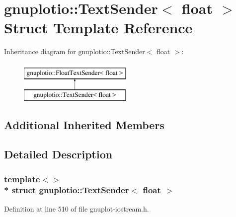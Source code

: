 \hypertarget{structgnuplotio_1_1_text_sender_3_01float_01_4}{}\section{gnuplotio\+:\+:Text\+Sender$<$ float $>$ Struct Template Reference}
\label{structgnuplotio_1_1_text_sender_3_01float_01_4}
Inheritance diagram for gnuplotio\+:\+:Text\+Sender$<$ float $>$\+:\begin{figure}[H]
\begin{center}
\leavevmode
\includegraphics[height=2.000000cm]{structgnuplotio_1_1_text_sender_3_01float_01_4}
\end{center}
\end{figure}
\subsection*{Additional Inherited Members}


\subsection{Detailed Description}
\subsubsection*{template$<$$>$\\*
struct gnuplotio\+::\+Text\+Sender$<$ float $>$}



Definition at line 510 of file gnuplot-\/iostream.\+h.

